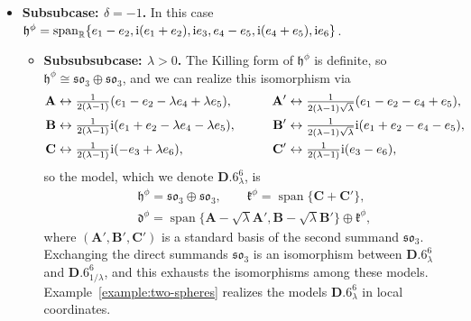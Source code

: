 \documentclass[10pt,a4paper]{amsart}
\newlength{\caseIndent}
\DeclareMathOperator{\spanOperator}{span}
\newcommand{\bbR}{\mathbb{R}}
\newcommand{\mbA}{\mathbf{A}}
\newcommand{\mbB}{\mathbf{B}}
\newcommand{\mbC}{\mathbf{C}}
\newcommand{\mfd} {\mathfrak{d}}
\newcommand{\mfh} {\mathfrak{h}}
\newcommand{\mfk} {\mathfrak{k}}
\newcommand{\mfso} {\mathfrak{so}}
\numberwithin{equation}{section}
\begin{document}
\begin{itemize}[leftmargin=\caseIndent]
\begin{itemize}[leftmargin=\caseIndent]
	\item[] \textbf{Subsubcase: $\delta = -1$.} In this case $\mfh^{\phi} = \spanOperator_{\bbR}\{ e_1 - e_2, {\rm i} (e_1 + e_2), {\rm i} e_3, e_4 - e_5, {\rm i} (e_4 + e_5), {\rm i} e_6 \}$.
		\begin{itemize}[leftmargin=\caseIndent]\itemsep=0pt
			\item[] \textbf{Subsubsubcase: $\lambda > 0$.} The Killing form of $\mfh^{\phi}$ is definite, so $\mfh^{\phi} \cong \mfso_3 \oplus \mfso_3$, and we can realize this isomorphism via
		\begin{alignat*}{4}
			\mbA
				& \leftrightarrow \tfrac{1}{2 (\lambda - 1)} (e_1 - e_2 - \lambda e_4 + \lambda e_5) , \qquad &
			\mbA'
				&\leftrightarrow \tfrac{1}{2 (\lambda - 1) \sqrt{\lambda}} (e_1 - e_2 - e_4 + e_5) , \\
			\mbB
				&\leftrightarrow \tfrac{1}{2 (\lambda - 1)} {\rm i} (e_1 + e_2 - \lambda e_4 - \lambda e_5) , \qquad &
			\mbB'
				&\leftrightarrow \tfrac{1}{2 (\lambda - 1) \sqrt{\lambda}} {\rm i} (e_1 + e_2 - e_4 - e_5) , \\
			\mbC
				&\leftrightarrow \tfrac{1}{2 (\lambda - 1)} {\rm i} (-e_3 + \lambda e_6 ) , \qquad &
			\mbC'
				&\leftrightarrow \tfrac{1}{2 (\lambda - 1)} {\rm i} (e_3 - e_6) ,
		\end{alignat*}
		so the model, which we denote $\mathbf{D.6}_{\lambda}^6$, is
		\begin{equation*}
			\boxed{
 \begin{split}
 &\mfh^{\phi} = \mfso_3 \oplus \mfso_3 , \qquad
	 	 \mfk^{\phi} = \operatorname{span}\big\{\mbC + \mbC'\big\} , \\
 &\mfd^{\phi} = \operatorname{span}\big\{\mbA - \sqrt{\lambda} \mbA', \mbB - \sqrt{\lambda} \mbB'\big\} \oplus \mfk^{\phi} ,
 \end{split}
			}
		\end{equation*}
		where $(\mbA', \mbB', \mbC')$ is a standard basis of the second summand $\mfso_3$. Exchanging the direct summands $\mfso_3$ is an isomorphism between $\mathbf{D.6}_{\lambda}^6$ and $\mathbf{D.6}_{1 / \lambda}^6$, and this exhausts the isomorphisms among these models. Example~\ref{example:two-spheres} realizes the models $\mathbf{D.6}_{\lambda}^6$ in local coordinates.


\end{itemize}
\end{itemize}
\end{itemize}
\end{document}

